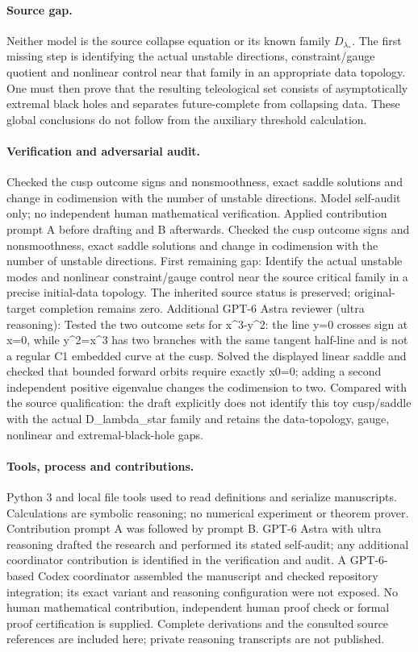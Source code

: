 \documentclass[11pt]{article}
\begin{document}
\paragraph{Source gap.} Neither model is the source collapse equation or its known family \(D_{\lambda_*}\). The first missing step is identifying the actual unstable directions, constraint/gauge quotient and nonlinear control near that family in an appropriate data topology. One must then prove that the resulting teleological set consists of asymptotically extremal black holes and separates future-complete from collapsing data. These global conclusions do not follow from the auxiliary threshold calculation.

\paragraph{Verification and adversarial audit.}
Checked the cusp outcome signs and nonsmoothness, exact saddle solutions and change in codimension with the number of unstable directions. Model self-audit only; no independent human mathematical verification. Applied contribution prompt A before drafting and B afterwards. Checked the cusp outcome signs and nonsmoothness, exact saddle solutions and change in codimension with the number of unstable directions. First remaining gap: Identify the actual unstable modes and nonlinear constraint/gauge control near the source critical family in a precise initial-data topology. The inherited source status is preserved; original-target completion remains zero. Additional GPT-6 Astra reviewer (ultra reasoning): Tested the two outcome sets for x\textasciicircum{}3-y\textasciicircum{}2: the line y=0 crosses sign at x=0, while y\textasciicircum{}2=x\textasciicircum{}3 has two branches with the same tangent half-line and is not a regular C1 embedded curve at the cusp. Solved the displayed linear saddle and checked that bounded forward orbits require exactly x0=0; adding a second independent positive eigenvalue changes the codimension to two. Compared with the source qualification: the draft explicitly does not identify this toy cusp/saddle with the actual D\_lambda\_star family and retains the data-topology, gauge, nonlinear and extremal-black-hole gaps.

\paragraph{Tools, process and contributions.}
Python 3 and local file tools used to read definitions and serialize manuscripts. Calculations are symbolic reasoning; no numerical experiment or theorem prover. Contribution prompt A was followed by prompt B. GPT-6 Astra with ultra reasoning drafted the research and performed its stated self-audit; any additional coordinator contribution is identified in the verification and audit. A GPT-6-based Codex coordinator assembled the manuscript and checked repository integration; its exact variant and reasoning configuration were not exposed. No human mathematical contribution, independent human proof check or formal proof certification is supplied. Complete derivations and the consulted source references are included here; private reasoning transcripts are not published.
\end{document}
